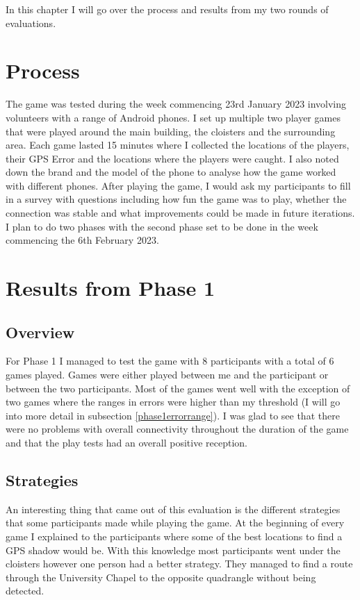 \documentclass{l4proj}
\begin{document}
In this chapter I will go over the process and results from my two rounds of evaluations.

\section{Process}
The game was tested during the week commencing 23rd January 2023 involving volunteers with a range of Android phones. I set up multiple two player
games that were played around the main building, the cloisters and the surrounding area. Each game lasted 15 minutes where I collected the locations
of the players, their GPS Error and the locations where the players were caught. I also noted down the brand and the model of the phone to analyse
how the game worked with different phones. After playing the game, I would ask my participants to fill in a survey with questions including how
fun the game was to play, whether the connection was stable and what improvements could be made in future iterations. I plan to do two phases
with the second phase set to be done in the week commencing the 6th February 2023.

\section{Results from Phase 1}
\label{phase1}

\subsection{Overview}
For Phase 1 I managed to test the game with 8 participants with a total of 6 games played. Games were either played between me and the participant
or between the two participants. Most of the games went well with the exception of two games where the ranges in errors were higher than my threshold
(I will go into more detail in subsection \ref{phase1errorrange}). I was glad to see that there were no problems with overall connectivity throughout
the duration of the game and that the play tests had an overall positive reception.

\subsection{Strategies}
An interesting thing that came out of this evaluation is the different strategies that some participants made while playing the game. At the beginning
of every game I explained to the participants where some of the best locations to find a GPS shadow would be. With this knowledge most participants
went under the cloisters however one person had a better strategy. They managed to find a route through the University Chapel to the opposite
quadrangle without being detected.
\end{document}
